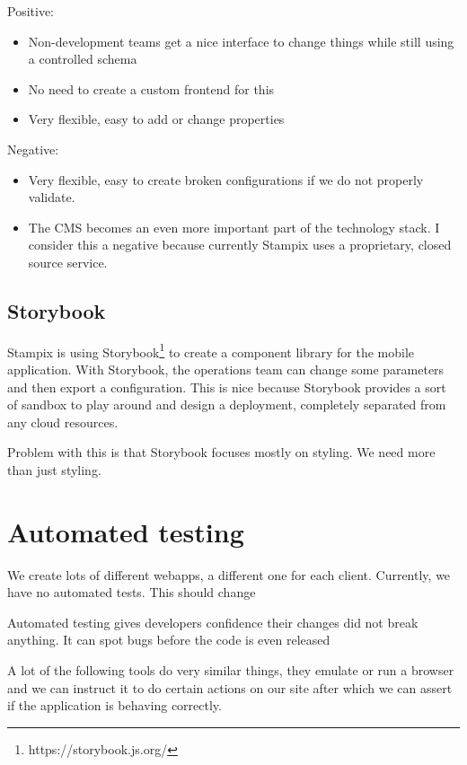 Positive:

\begin{itemize}
	\item Non-development teams get a nice interface to change things while still using a controlled schema
	\item No need to create a custom frontend for this
	\item Very flexible, easy to add or change properties
\end{itemize}

Negative:

\begin{itemize}
	\item Very flexible, easy to create broken configurations if we do not properly validate.
	\item The CMS becomes an even more important part of the technology stack. I consider this a negative because currently Stampix uses a proprietary, closed source service.
\end{itemize}


\subsection{Storybook}

Stampix is using Storybook\footnote{https://storybook.js.org/} to create a component library for the mobile application. With Storybook, the operations team can change some parameters and then export a configuration.
This is nice because Storybook provides a sort of sandbox to play around and design a deployment, completely separated from any cloud resources.

Problem with this is that Storybook focuses mostly on styling. We need more than just styling.


\section{Automated testing}

We create lots of different webapps, a different one for each client. Currently, we have no automated tests. This should change

Automated testing gives developers confidence their changes did not break anything. It can spot bugs before the code is even released

A lot of the following tools do very similar things, they emulate or run a browser and we can instruct it to do certain actions on our site after which we can assert if the application is behaving correctly.



